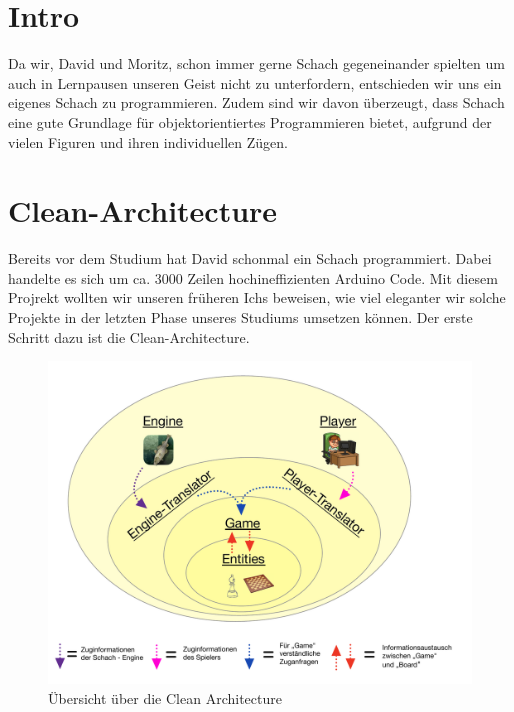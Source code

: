 \documentclass[
10pt, %
a4paper, %
oneside, %
headinclude,footinclude, %
BCOR5mm, %
]{scrartcl}
\begin{document}
\newpage %
\begin{onehalfspace}
\section{Intro}

Da wir, David und Moritz, schon immer gerne Schach gegeneinander spielten um auch in Lernpausen unseren Geist nicht zu unterfordern, entschieden wir uns ein eigenes Schach zu programmieren. 
Zudem sind wir davon überzeugt, dass Schach eine gute Grundlage für objektorientiertes Programmieren bietet, aufgrund der vielen Figuren und ihren individuellen Zügen.

\section{Clean-Architecture} \label{sec:cleanArc}
Bereits vor dem Studium hat David schonmal ein Schach programmiert. Dabei handelte es sich um ca. 3000 Zeilen hochineffizienten Arduino Code. Mit diesem Projrekt wollten wir unseren früheren Ichs beweisen, wie viel eleganter wir solche Projekte in der letzten Phase unseres Studiums umsetzen können. Der erste Schritt dazu ist die Clean-Architecture.

\begin{figure}[h]
	\begin{center}
		\includegraphics[width = \textwidth]{onion.pdf}
		\caption{Übersicht über die Clean Architecture}
		\label{pic:cleanArc}
	\end{center}
\end{figure}



\end{onehalfspace}
\end{document}
